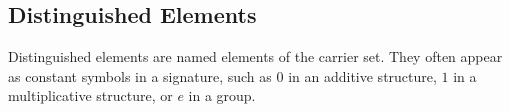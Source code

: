 \subsection{Distinguished Elements}
\label{subsec:structure-distinguished-elements}

\begin{remark*}[Exposition]
Distinguished elements are named elements of the carrier set.  They often
appear as constant symbols in a signature, such as $0$ in an additive structure,
$1$ in a multiplicative structure, or $e$ in a group.
\end{remark*}
